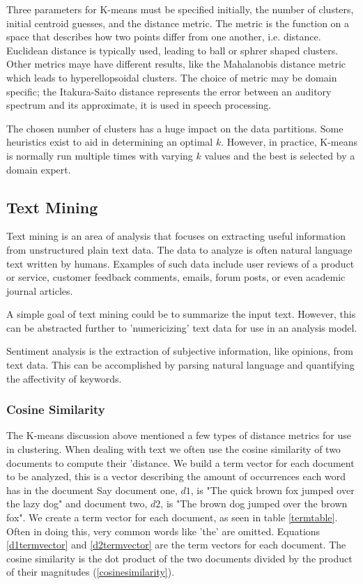 \documentclass[12pt]{article}
\begin{document}
\begin{doublespacing}
Three parameters for K-means must be specified initially, the number of clusters, initial centroid guesses, and the distance metric.
The metric is the function on a space that describes how two points differ from one another, i.e. distance.
Euclidean distance is typically used, leading to ball or sphrer shaped clusters. \citep{Jain2010651}
Other metrics maye have different results, like the Mahalanobis distance metric which leads to hyperellopsoidal clusters. \citep{MaoJain1996}
The choice of metric may be domain specific; the Itakura-Saito distance represents the error between an auditory spectrum and its approximate, it is used in speech processing. \citep{chan2008advances}

The chosen number of clusters has a huge impact on the data partitions.
Some heuristics exist to aid in determining an optimal $k$. \citep{tibshirani2001estimating}
However, in practice, K-means is normally run multiple times with varying $k$ values and the best is selected by a domain expert.


\subsection{Text Mining}
Text mining is an area of analysis that focuses on extracting useful information from unstructured plain text data.
The data to analyze is often natural language text written by humans.
Examples of such data include user reviews of a product or service, customer feedback comments, emails, forum posts, or even academic journal articles.

A simple goal of text mining could be to summarize the input text.
However, this can be abstracted further to 'numericizing' text data for use in an analysis model.

Sentiment analysis is the extraction of subjective information, like opinions, from text data.
This can be accomplished by parsing natural language and quantifying the affectivity of keywords.

\subsubsection{Cosine Similarity}
The K-means discussion above mentioned a few types of distance metrics for use in clustering.
When dealing with text we often use the cosine similarity of two documents to compute their 'distance.
We build a term vector for each document to be analyzed, this is a vector describing the amount of occurrences each word has in the document
Say document one, $d1$, is "The quick brown fox jumped over the lazy dog" and document two, $d2$, is "The brown dog jumped over the brown fox".
We create a term vector for each document, as seen in table \ref{termtable}. 
Often in doing this, very common words like 'the' are omitted.
Equations \ref{d1termvector} and \ref{d2termvector} are the term vectors for each document.
The cosine similarity is the dot product of the two documents divided by the product of their magnitudes (\ref{cosinesimilarity}). \citep{huang2008similarity}


\end{doublespacing}
\end{document}
